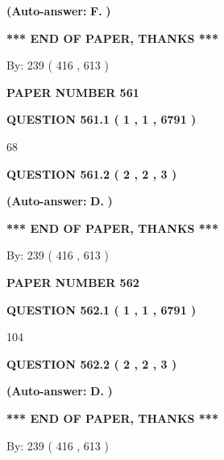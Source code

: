 \documentclass[12pt]{article}
\begin{document}
 
{\textbf{(Auto-answer:}}
{\textbf{\large{
F.}}}
{\textbf{)}}
 
 
   
   
   
   
\vspace{1.0in} 
{\textbf{\large{ *** END OF PAPER, THANKS *** }}} 
   
   
\hspace{1.0in} By: 
 239 ( 416 ,  613 )
   
   
   
   
\newpage 
\setcounter{page}{ 
   561001 } 
   
   
 {\textbf{ \Large{ PAPER NUMBER  561  }}}
   
   
   
   
  
  
{\textbf{\large{QUESTION
561.1 
 ( 1 , 1 , 6791 )
}}}

68
  
  
{\textbf{\large{QUESTION
561.2 
 ( 2 , 2 , 3 )
}}}
 
 
{\textbf{(Auto-answer:}}
{\textbf{\large{
D.}}}
{\textbf{)}}
 
 
   
   
   
   
\vspace{1.0in} 
{\textbf{\large{ *** END OF PAPER, THANKS *** }}} 
   
   
\hspace{1.0in} By: 
 239 ( 416 ,  613 )
   
   
   
   
\newpage 
\setcounter{page}{ 
   562001 } 
   
   
 {\textbf{ \Large{ PAPER NUMBER  562  }}}
   
   
   
   
  
  
{\textbf{\large{QUESTION
562.1 
 ( 1 , 1 , 6791 )
}}}

104
  
  
{\textbf{\large{QUESTION
562.2 
 ( 2 , 2 , 3 )
}}}
 
 
{\textbf{(Auto-answer:}}
{\textbf{\large{
D.}}}
{\textbf{)}}
 
 
   
   
   
   
\vspace{1.0in} 
{\textbf{\large{ *** END OF PAPER, THANKS *** }}} 
   
   
\hspace{1.0in} By: 
 239 ( 416 ,  613 )
   
   
   
\end{document}
